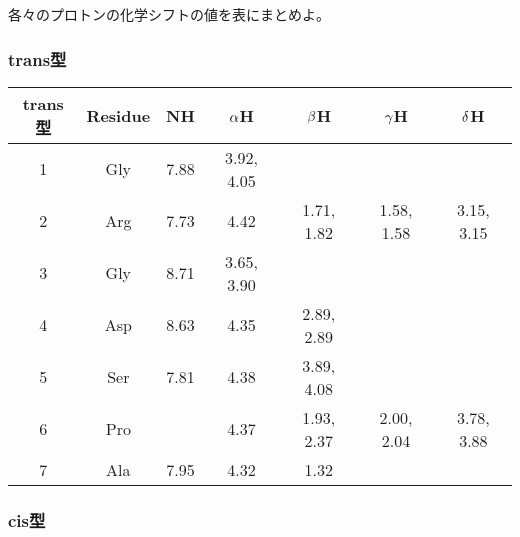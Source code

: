 \documentclass[a4paper,papersize,dvipdfmx]{jsarticle}
\begin{document}
\begin{tcolorbox}[colback=white,colbacktitle=black!10!white,coltitle=black,title={1}]
各々のプロトンの化学シフトの値を表にまとめよ。
\end{tcolorbox}

\subsubsection*{trans型}

\begin{table}[H]
\begin{center}
\begin{tabular}{|c|c|c|c|c|c|c|}
\hline
trans型 & Residue & NH   & $\rm \alpha$H        & $\rm \beta$H        & $\rm \gamma$H        & $\rm \delta$H        \\ \hline
1 & Gly     & 7.88 & 3.92, 4.05 &         &          &          \\ \hline
2 & Arg     & 7.73 & 4.42      & 1.71, 1.82 & 1.58, 1.58 & 3.15, 3.15 \\ \hline
3 & Gly     & 8.71 & 3.65, 3.90 &           &           &           \\ \hline
4 & Asp     & 8.63 & 4.35      & 2.89, 2.89 &           &           \\ \hline
5 & Ser     & 7.81 & 4.38      & 3.89, 4.08 &           &           \\ \hline
6 & Pro     &      & 4.37      & 1.93, 2.37 & 2.00, 2.04 & 3.78, 3.88 \\ \hline
7 & Ala     & 7.95 & 4.32      & 1.32      &           &           \\ \hline
\end{tabular}
\end{center}
\end{table}


\subsubsection*{cis型}
\end{document}

